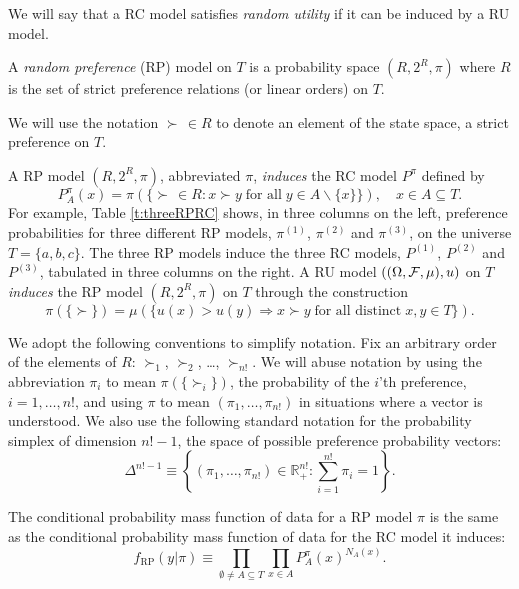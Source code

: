 \documentclass[11pt,letter]{article}
\begin{document}
We will say that a RC model satisfies {\em random utility} if it can be induced by a RU model.

\begin{defn}
	A {\em random preference} (RP) model on $T$ is a probability space $(R,2^R,\pi)$ where $R$ is the set of strict preference relations (or linear orders) on $T$.
\end{defn}
We will use the notation $\succ\, \in R$ to denote an element of the state space, a strict preference on $T$.

A RP model $(R,2^R,\pi)$, abbreviated $\pi$, {\em induces} the RC model $P^\pi$ defined by
\[
    P^\pi_A(x) = \pi\left(
    \{\succ\, \in R \colon x \succ y \; \mbox{for all} \; y \in A\backslash \{x\}\}
    \right),
    \quad x \in A \subseteq T.
\]
For example, Table \ref{t:threeRPRC} shows, in three columns on the left, preference probabilities for three different RP models, $\pi^{(1)}$, $\pi^{(2)}$ and $\pi^{(3)}$, on the universe $T = \{a,b,c\}$.
The three RP models induce the three RC models, $P^{(1)}$, $P^{(2)}$ and $P^{(3)}$, tabulated in three columns on the right.
A RU model $((\Omega,{\cal F},\mu), u)$ on $T$ {\em induces} the RP model $(R,2^R,\pi)$ on $T$ through the construction
\[
  \pi(\{\succ\}) = \mu(\{u(x) > u(y) \Rightarrow x \succ y\; \mbox{for all distinct}\; x,y \in T\}).
\]

We adopt the following conventions to simplify notation.
Fix an arbitrary order of the elements of $R$: $\succ_1$, $\succ_2$, \ldots, $\succ_{n!}$.
We will abuse notation by using the abbreviation $\pi_i$ to mean $\pi(\{\succ_i\})$, the probability of the $i$'th preference, $i=1,\ldots,n!$, and using $\pi$ to mean $(\pi_1,\ldots,\pi_{n!})$ in situations where a vector is understood.
We also use the following standard notation for the probability simplex of dimension $n!-1$, the space of possible preference probability vectors:
\begin{equation}\label{e:simplex}
  \Delta^{n!-1} \equiv \left\{ (\pi_1,\ldots,\pi_{n!}) \in \mathbb{R}_+^{n!} \colon \sum_{i=1}^{n!} \pi_i = 1 \right\}.
\end{equation}

The conditional probability mass function of data for a RP model $\pi$ is the same as the conditional probability mass function of data for the RC model it induces:
\begin{equation}\label{e:likepi}
  f_{\mathrm{RP}}(y|\pi) \equiv \prod_{\emptyset \neq A \subseteq T} \prod_{x \in A} P^\pi_A(x)^{N_A(x)}.
\end{equation}
\end{document}
